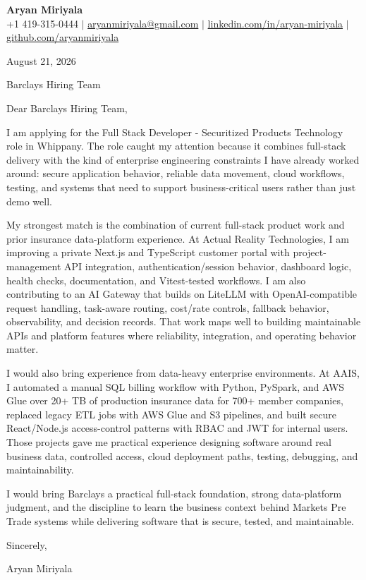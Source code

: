 \documentclass[letterpaper,11pt]{article}
\begin{document}
\begin{center}
  {\Large \textbf{Aryan Miriyala}}\\
  \small
  +1 419-315-0444 $|$
  \href{mailto:aryanmiriyala@gmail.com}{aryanmiriyala@gmail.com} $|$
  \href{https://www.linkedin.com/in/aryan-miriyala-7788a21b6/}{linkedin.com/in/aryan-miriyala} $|$
  \href{https://github.com/aryanmiriyala}{github.com/aryanmiriyala}
\end{center}

August 21, 2026

Barclays Hiring Team

Dear Barclays Hiring Team,

I am applying for the Full Stack Developer - Securitized Products Technology role in Whippany. The role caught my attention because it combines full-stack delivery with the kind of enterprise engineering constraints I have already worked around: secure application behavior, reliable data movement, cloud workflows, testing, and systems that need to support business-critical users rather than just demo well.

My strongest match is the combination of current full-stack product work and prior insurance data-platform experience. At Actual Reality Technologies, I am improving a private Next.js and TypeScript customer portal with project-management API integration, authentication/session behavior, dashboard logic, health checks, documentation, and Vitest-tested workflows. I am also contributing to an AI Gateway that builds on LiteLLM with OpenAI-compatible request handling, task-aware routing, cost/rate controls, fallback behavior, observability, and decision records. That work maps well to building maintainable APIs and platform features where reliability, integration, and operating behavior matter.

I would also bring experience from data-heavy enterprise environments. At AAIS, I automated a manual SQL billing workflow with Python, PySpark, and AWS Glue over 20+ TB of production insurance data for 700+ member companies, replaced legacy ETL jobs with AWS Glue and S3 pipelines, and built secure React/Node.js access-control patterns with RBAC and JWT for internal users. Those projects gave me practical experience designing software around real business data, controlled access, cloud deployment paths, testing, debugging, and maintainability.

I would bring Barclays a practical full-stack foundation, strong data-platform judgment, and the discipline to learn the business context behind Markets Pre Trade systems while delivering software that is secure, tested, and maintainable.

Sincerely,

Aryan Miriyala
\end{document}
